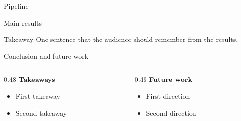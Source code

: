 \documentclass[aspectratio=169,11pt,t]{beamer}
\begin{document}
\begin{frame}{Pipeline}
  \centering
\end{frame}


\begin{frame}{Main results}
  \centering
  \hfill
  \hfill
  \vskip0.5cm
  \begin{alertblock}{Takeaway}
    One sentence that the audience should remember from the results.
  \end{alertblock}
\end{frame}


\begin{frame}{Conclusion and future work}
  \begin{columns}[T,onlytextwidth]
    \begin{column}{0.48\textwidth}
      \textbf{\color{aimBlue}Takeaways}
      \begin{itemize}
        \item First takeaway
        \item Second takeaway
      \end{itemize}
    \end{column}
    \begin{column}{0.48\textwidth}
      \textbf{\color{aimBlue}Future work}
      \begin{itemize}
        \item First direction
        \item Second direction
      \end{itemize}
    \end{column}
  \end{columns}
\end{frame}

\end{document}
